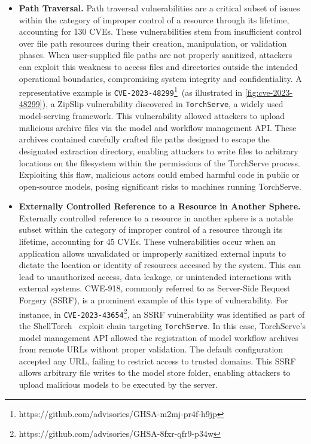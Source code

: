 \begin{itemize}[leftmargin=10pt]
    \item \textbf{Path Traversal.} Path traversal vulnerabilities are a critical subset of issues within the category of improper control of a resource through its lifetime, accounting for 130 CVEs. These vulnerabilities stem from insufficient control over file path resources during their creation, manipulation, or validation phases. When user-supplied file paths are not properly sanitized, attackers can exploit this weakness to access files and directories outside the intended operational boundaries, compromising system integrity and confidentiality. A representative example is \texttt{CVE-2023-48299}\footnote{https://github.com/advisories/GHSA-m2mj-pr4f-h9jp}~(as illustrated in \autoref{fig:cve-2023-48299}), a ZipSlip vulnerability discovered in \texttt{TorchServe}, a widely used model-serving framework. This vulnerability allowed attackers to upload malicious archive files via the model and workflow management API. These archives contained carefully crafted file paths designed to escape the designated extraction directory, enabling attackers to write files to arbitrary locations on the filesystem within the permissions of the TorchServe process. Exploiting this flaw, malicious actors could embed harmful code in public or open-source models, posing significant risks to machines running TorchServe.

    \item \textbf{Externally Controlled Reference to a Resource in Another Sphere.} Externally controlled reference to a resource in another sphere is a notable subset within the category of improper control of a resource through its lifetime, accounting for 45 CVEs. These vulnerabilities occur when an application allows unvalidated or improperly sanitized external inputs to dictate the location or identity of resources accessed by the system. This can lead to unauthorized access, data leakage, or unintended interactions with external systems. CWE-918, commonly referred to as Server-Side Request Forgery (SSRF), is a prominent example of this type of vulnerability. For instance, in \texttt{CVE-2023-43654}\footnote{https://github.com/advisories/GHSA-8fxr-qfr9-p34w}, an SSRF vulnerability was identified as part of the ShellTorch~\cite{shelltorch} exploit chain targeting \texttt{TorchServe}. In this case, TorchServe's model management API allowed the registration of model workflow archives from remote URLs without proper validation. The default configuration accepted any URL, failing to restrict access to trusted domains. This SSRF allows arbitrary file writes to the model store folder, enabling attackers to upload malicious models to be executed by the server.


\end{itemize}
